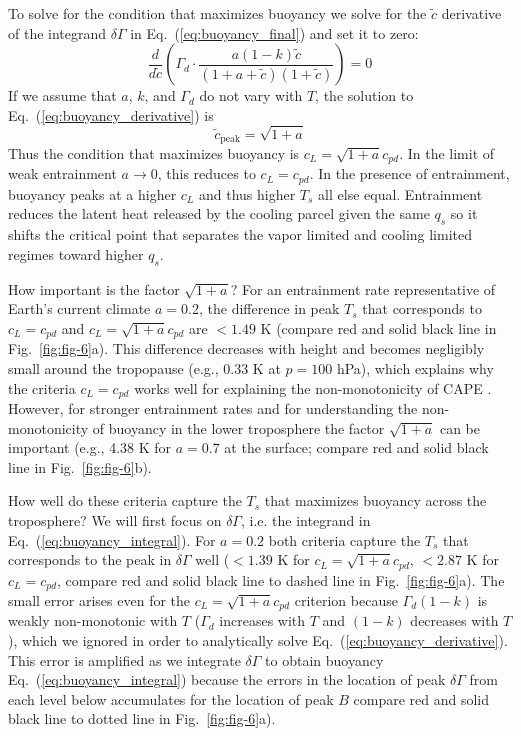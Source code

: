 \documentclass[draft]{ametsocV6.1}
\begin{document}
To solve for the condition that maximizes buoyancy we solve for the $\tilde{c}$ derivative of the integrand $\delta \Gamma$ in Eq.~(\ref{eq:buoyancy_final}) and set it to zero:
\begin{equation}
    \frac{d}{d \tilde{c}}\left(\Gamma_d \cdot \frac{a(1-k)\tilde{c}}{(1+a+\tilde{c})(1+\tilde{c})}\right) = 0 \label{eq:buoyancy_derivative}
\end{equation}
If we assume that $a$, $k$, and $\Gamma_d$ do not vary with $T$, the solution to Eq.~(\ref{eq:buoyancy_derivative}) is
\begin{equation}
    \tilde{c}_\text{peak}=\sqrt{1+a} \label{eq:buoyancy_quadratic}
\end{equation}
Thus the condition that maximizes buoyancy is $c_L = \sqrt{1+a} c_{pd}$. In the limit of weak entrainment $a \to 0$, this reduces to $c_L = c_{pd}$. In the presence of entrainment, buoyancy peaks at a higher $c_L$ and thus higher $T_s$ all else equal. Entrainment reduces the latent heat released by the cooling parcel given the same $q_s$ so it shifts the critical point that separates the vapor limited and cooling limited regimes toward higher $q_s$.

How important is the factor $\sqrt{1+a}$? For an entrainment rate representative of Earth's current climate $a=0.2$, the difference in peak $T_s$ that corresponds to $c_L=c_{pd}$ and $c_L=\sqrt{1+a}c_{pd}$ are $< 1.49$ K (compare red and solid black line in Fig.~\ref{fig:fig-6}a). This difference decreases with height and becomes negligibly small around the tropopause (e.g., 0.33 K at $p=100$ hPa), which explains why the criteria $c_L = c_{pd}$ works well for explaining the non-monotonicity of CAPE \citep{romps2016}. However, for stronger entrainment rates and for understanding the non-monotonicity of buoyancy in the lower troposphere the factor $\sqrt{1+a}$ can be important (e.g., 4.38 K for $a=0.7$ at the surface; compare red and solid black line in Fig.~\ref{fig:fig-6}b).


How well do these criteria capture the $T_s$ that maximizes buoyancy across the troposphere? We will first focus on $\delta \Gamma$, i.e. the integrand in Eq.~(\ref{eq:buoyancy_integral}). For $a=0.2$ both criteria capture the $T_s$ that corresponds to the peak in $\delta \Gamma$ well ($<1.39$ K for $c_L=\sqrt{1+a}c_{pd}$, $< 2.87$ K for $c_L=c_{pd}$, compare red and solid black line to dashed line in Fig.~\ref{fig:fig-6}a). The small error arises even for the $c_L=\sqrt{1+a}c_{pd}$ criterion because $\Gamma_d(1-k)$ is weakly non-monotonic with $T$ ($\Gamma_d$ increases with $T$ and $(1-k)$ decreases with $T$), which we ignored in order to analytically solve Eq.~(\ref{eq:buoyancy_derivative}). This error is amplified as we integrate $\delta \Gamma$ to obtain buoyancy Eq.~(\ref{eq:buoyancy_integral}) because the errors in the location of peak $\delta \Gamma$ from each level below accumulates for the location of peak $B$ compare red and solid black line to dotted line in Fig.~\ref{fig:fig-6}a).
\end{document}
